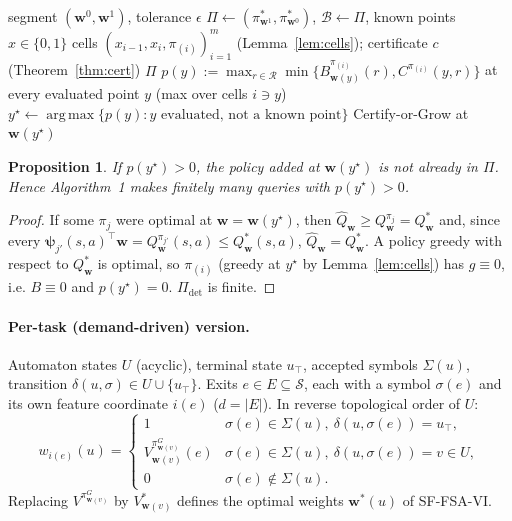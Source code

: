 \documentclass[11pt]{article}
\newcommand{\vpsi}{\bm{\psi}}
\newcommand{\w}{\mathbf{w}}
\newcommand{\cS}{\mathcal S}
\newcommand{\cR}{\mathcal R}
\DeclareMathOperator*{\argmax}{arg\,max}
\newtheorem{proposition}{Proposition}
\theoremstyle{definition}
\begin{document}
\begin{algorithm}[H]
\caption{GPI-targeted Certify-or-Grow on a segment}
\begin{algorithmic}[1]
\Require segment $(\w^0,\w^1)$, tolerance $\epsilon$
\State $\Pi\gets(\pi^*_{\w^1},\pi^*_{\w^0})$, $\mathcal B\gets\Pi$, known points $x\in\{0,1\}$
\Loop
  \State cells $(x_{i-1},x_i,\pi_{(i)})_{i=1}^m$ (Lemma~\ref{lem:cells}); certificate $c$ (Theorem~\ref{thm:cert})
   \Return $\Pi$ \EndIf
  \State $p(y):=\max_{r\in\cR}\min\{B^{\pi_{(i)}}_{\w(y)}(r),C^{\pi_{(i)}}(y,r)\}$ at every evaluated point $y$ (max over cells $i\ni y$)
  \State $y^\star\gets\argmax\{p(y):y \text{ evaluated, not a known point}\}$
  \State Certify-or-Grow at $\w(y^\star)$
\EndLoop
\end{algorithmic}
\end{algorithm}

\begin{proposition}\label{prop:new}
If $p(y^\star)>0$, the policy added at $\w(y^\star)$ is not already in $\Pi$. Hence Algorithm~1 makes finitely many
queries with $p(y^\star)>0$.
\end{proposition}
\begin{proof}
If some $\pi_j$ were optimal at $\w=\w(y^\star)$, then $\hat Q_\w\ge Q^{\pi_j}_\w=Q^*_\w$ and, since every
$\vpsi_{j'}(s,a)^\top\w=Q^{\pi_{j'}}_\w(s,a)\le Q^*_\w(s,a)$, $\hat Q_\w=Q^*_\w$. A policy greedy with respect to
$Q^*_\w$ is optimal, so $\pi_{(i)}$ (greedy at $y^\star$ by Lemma~\ref{lem:cells}) has $g\equiv0$, i.e.
$B\equiv0$ and $p(y^\star)=0$. $\Pi_{\det}$ is finite.
\end{proof}

\paragraph{Per-task (demand-driven) version.} Automaton states $U$ (acyclic), terminal state $u_\top$, accepted
symbols $\Sigma(u)$, transition $\delta(u,\sigma)\in U\cup\{u_\top\}$. Exits $e\in E\subseteq\cS$, each with a
symbol $\sigma(e)$ and its own feature coordinate $i(e)$ ($d=|E|$). In reverse topological order of $U$:
\[
w_{i(e)}(u)=\begin{cases}
1 & \sigma(e)\in\Sigma(u),\ \delta(u,\sigma(e))=u_\top,\\
V^{\pi^G_{\w(v)}}_{\w(v)}(e) & \sigma(e)\in\Sigma(u),\ \delta(u,\sigma(e))=v\in U,\\
0 & \sigma(e)\notin\Sigma(u).
\end{cases}
\]
Replacing $V^{\pi^G_{\w(v)}}$ by $V^*_{\w(v)}$ defines the optimal weights $\w^*(u)$ of SF-FSA-VI.
\end{document}
